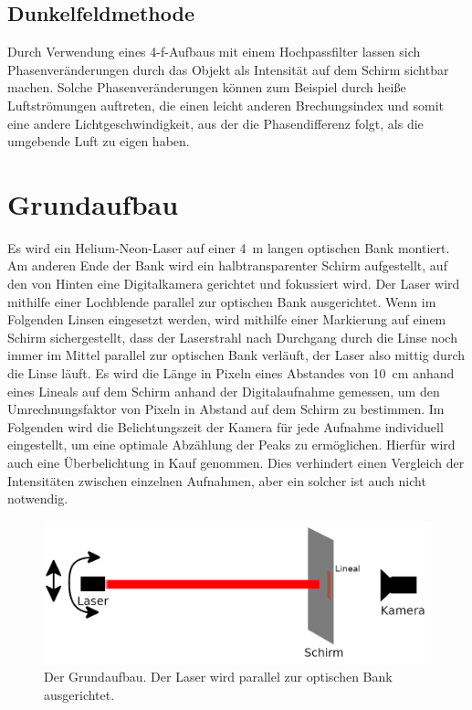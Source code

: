 \documentclass[
	a4paper,
	12pt,
	pagesize,
	ngerman
]{scrartcl}
\begin{document}
	\subsection{Dunkelfeldmethode}

	Durch Verwendung eines 4-f-Aufbaus mit einem Hochpassfilter lassen sich Phasenveränderungen durch das Objekt als Intensität auf dem Schirm sichtbar machen.
	Solche Phasenveränderungen können zum Beispiel durch heiße Luftströmungen auftreten, die einen leicht anderen Brechungsindex und somit eine andere Lichtgeschwindigkeit, aus der die Phasendifferenz folgt, als die umgebende Luft zu eigen haben.

	\section{Grundaufbau}
	Es wird ein Helium-Neon-Laser auf einer \SI{4}{m} langen optischen Bank montiert.
	Am anderen Ende der Bank wird ein halbtransparenter Schirm aufgestellt, auf den von Hinten eine Digitalkamera gerichtet und fokussiert wird. %
	Der Laser wird mithilfe einer Lochblende parallel zur optischen Bank ausgerichtet.
	Wenn im Folgenden Linsen eingesetzt werden, wird mithilfe einer Markierung auf einem Schirm sichergestellt, dass der Laserstrahl nach Durchgang durch die Linse noch immer im Mittel parallel zur optischen Bank verläuft, der Laser also mittig durch die Linse läuft. %
	Es wird die Länge in Pixeln eines Abstandes von \SI{10}{cm} anhand eines Lineals auf dem Schirm anhand der Digitalaufnahme gemessen, um den Umrechnungsfaktor von Pixeln in Abstand auf dem Schirm zu bestimmen.
	Im Folgenden wird die Belichtungszeit der Kamera für jede Aufnahme individuell eingestellt, um eine optimale Abzählung der Peaks zu ermöglichen.
	Hierfür wird auch eine Überbelichtung in Kauf genommen.
	Dies verhindert einen Vergleich der Intensitäten zwischen einzelnen Aufnahmen, aber ein solcher ist auch nicht notwendig.

	\begin{figure}[H]
			\includegraphics[width=1\linewidth]{img/grundaufbau}
			\caption{
				Der Grundaufbau. Der Laser wird parallel zur optischen Bank ausgerichtet.
			}
			\label{fig_grundaufbau}
	\end{figure}
\end{document}
